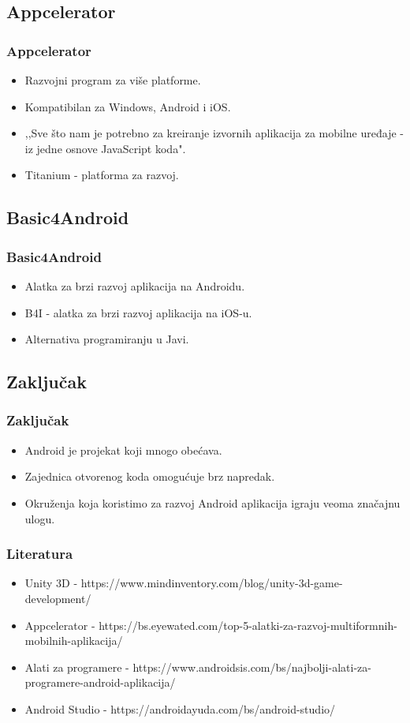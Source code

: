 \documentclass{beamer}
\begin{document}
\begin{frame}
    \section{Appcelerator}
    \frametitle{Appcelerator} 
    \begin{itemize}
    	\item Razvojni program za više platforme.
	\item Kompatibilan za Windows, Android i iOS.
	\item ,,Sve što nam je potrebno za kreiranje izvornih aplikacija za mobilne uređaje - iz jedne osnove JavaScript koda".
	\item  Titanium - platforma za razvoj.
   \end{itemize}
\end{frame}

\begin{frame}
    \section{Basic4Android}
    \frametitle{Basic4Android} 
    \begin{itemize}
	\item Alatka za brzi razvoj aplikacija na Androidu.
	\item B4I - alatka za brzi razvoj aplikacija na iOS-u.
	\item Alternativa programiranju u Javi.
   \end{itemize}
\end{frame}

\begin{frame}
    \section{Zaključak}
    \frametitle{Zaključak} 
    \begin{itemize}
	\item Android je projekat koji mnogo obećava.
	\item Zajednica otvorenog koda omogućuje brz napredak.
	\item Okruženja koja koristimo za razvoj Android aplikacija igraju veoma značajnu ulogu.
	
   \end{itemize}
\end{frame}

\begin{frame}
    \frametitle{Literatura}
    \begin{itemize}
    	\item Unity 3D - https://www.mindinventory.com/blog/unity-3d-game-development/
	\item Appcelerator - https://bs.eyewated.com/top-5-alatki-za-razvoj-multiformnih-mobilnih-aplikacija/
	\item Alati za programere - https://www.androidsis.com/bs/najbolji-alati-za-programere-android-aplikacija/
	\item Android Studio - https://androidayuda.com/bs/android-studio/
   \end{itemize}
\end{frame}
\end{document}

